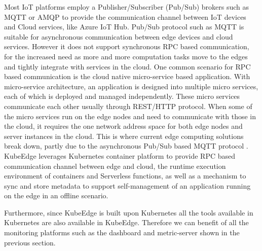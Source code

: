Most IoT platforms employ a Publisher/Subscriber (Pub/Sub) brokers such as MQTT \cite{mqttpubsub} or AMQP to provide the communication channel between IoT devices and Cloud services, like Azure IoT Hub. Pub/Sub protocol such as MQTT is suitable for asynchronous communication between edge devices and cloud services. However it does not support synchronous RPC based communication, for the increased need as more and more computation tasks \cite{bigdataedge}\cite{edgerealtime} move to the edges and tightly integrate with services in the cloud.
One common scenario for RPC based communication is the cloud native micro-service based application. With micro-service architecture, an application is designed into multiple micro services, each of which is deployed and managed independently. These micro services communicate each other usually through REST/HTTP protocol. When some of the micro services run on the edge nodes and need to communicate with those in the cloud, it requires the one network address space for both edge nodes and server instances in the cloud.
This is where current edge computing solutions break down, partly due to the asynchronous Pub/Sub based MQTT protocol \cite{kubeedgeinspection}.
KubeEdge leverages Kubernetes container platform to provide RPC based communication channel between edge and cloud, the runtime execution environment of containers and Serverless functions, as well as a mechanism to sync and store metadata to support self-management of an application running on the edge in an offline scenario.  

Furthermore, since KubeEdge is built upon Kubernetes all the tools available in Kubernetes are also available in KubeEdge. Therefore we can benefit of all the monitoring platforms such as the dashboard and metric-server shown in the previous section.

